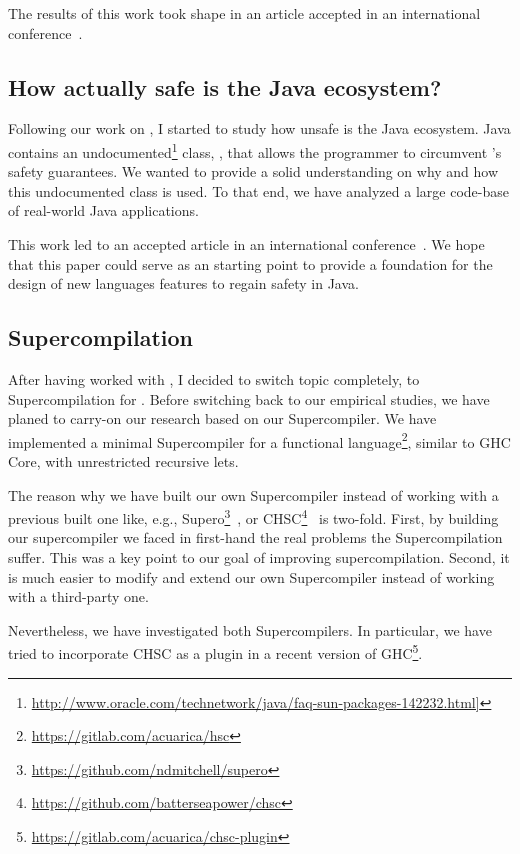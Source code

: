 The results of this work took shape in an article accepted in an international conference~\cite{Mastrangelo:2014:JJN:2647508.2647516}.

\subsection*{How actually safe is the Java ecosystem?}

Following our work on \jnif{}, I started to study how unsafe is the Java ecosystem.
Java contains an undocumented\footnote{\url{http://www.oracle.com/technetwork/java/faq-sun-packages-142232.html]}} class, \smu{}, that allows the programmer to circumvent \java{}'s safety guarantees.
We wanted to provide a solid understanding on why and how this undocumented class is used.
To that end, we have analyzed a large code-base of real-world Java applications.

This work led to an accepted article in an international conference~\cite{Mastrangelo:2015ep}.
We hope that this paper could serve as an starting point to provide a foundation for the design of new languages features to regain safety in Java.

\subsection*{Supercompilation}

After having worked with \java{}, I decided to switch topic completely, to Supercompilation for \haskell{}.
Before switching back to our empirical studies,
we have planed to carry-on our research based on our Supercompiler.
We have implemented a minimal Supercompiler for a functional language\footnote{\url{https://gitlab.com/acuarica/hsc}}, similar to GHC Core, with unrestricted recursive lets.

The reason why we have built our own Supercompiler instead of working with a previous built one like, e.g., Supero\footnote{\url{https://github.com/ndmitchell/supero}}~\cite{Mitchell:2007ki,Mitchell:2010ih}, or CHSC\footnote{\url{https://github.com/batterseapower/chsc}}~\cite{Bolingbroke:2010is} is two-fold.
First, by building our supercompiler we faced in first-hand the real problems the Supercompilation suffer. This was a key point to our goal of improving supercompilation.
Second, it is much easier to modify and extend our own Supercompiler instead of working with a third-party one.

Nevertheless, we have investigated both Supercompilers. In particular, we have tried to incorporate CHSC as a plugin in a recent version of GHC\footnote{\url{https://gitlab.com/acuarica/chsc-plugin}}.

